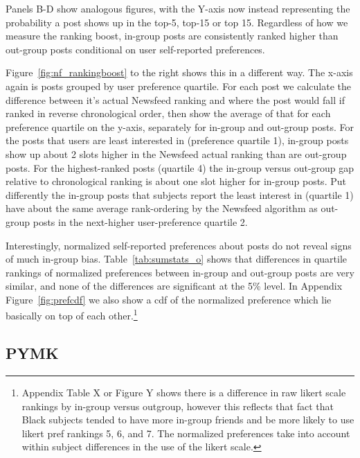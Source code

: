\documentclass[12pt,letterpaper]{article}
\begin{document}
Panels B-D show analogous figures, with the Y-axis now instead representing the probability a post shows up in the top-5, top-15 or top 15. Regardless of how we measure the ranking boost, in-group posts are consistently ranked higher than out-group posts conditional on user self-reported preferences.

Figure~\ref{fig:nf_rankingboost} to the right shows this in a different way. The x-axis again is posts grouped by user preference quartile. For each post we calculate the difference between it's actual Newsfeed ranking and where the post would fall if ranked in reverse chronological order, then show the average of that for each preference quartile on the y-axis, separately for in-group and out-group posts. For the posts that users are least interested in (preference quartile 1), in-group posts show up about 2 slots higher in the Newsfeed actual ranking than are out-group posts. For the highest-ranked posts (quartile 4) the in-group versus out-group gap relative to chronological ranking is about one slot higher for in-group posts. Put differently the in-group posts that subjects report the least interest in (quartile 1) have about the same average rank-ordering by the Newsfeed algorithm as out-group posts in the next-higher user-preference quartile 2.

Interestingly, normalized self-reported preferences about posts do not reveal signs of much in-group bias. Table~\ref{tab:sumstats_o} shows that differences in quartile rankings of normalized preferences between in-group and out-group posts are very similar, and none of the differences are significant at the 5\% level. In Appendix Figure~\ref{fig:prefcdf} we also show a cdf of the normalized preference which lie basically on top of each other.\footnote{Appendix Table X or Figure Y shows there is a difference in raw likert scale rankings by in-group versus outgroup, however this reflects that fact that Black subjects tended to have more in-group friends and be more likely to use likert pref rankings 5, 6, and 7. The normalized preferences take into account within subject differences in the use of the likert scale.} 

\subsection{PYMK}
\end{document}
